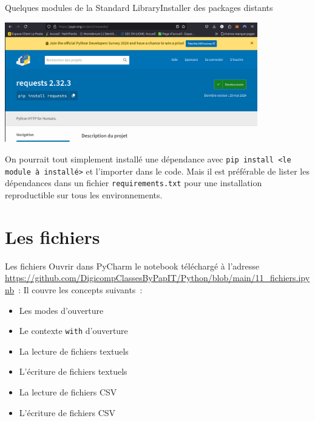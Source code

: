 \documentclass{beamer}
\begin{document}
    \begin{frame}{Quelques modules de la Standard Library}{Installer des packages distants}
        \begin{center}
            \includegraphics[width=11cm]{image/pypi-requests-page}
        \end{center}
        \begin{dangercolorbox}
            On pourrait tout simplement installé une dépendance avec \lstinline{pip install <le module à installé>} et l'importer dans le code.
            Mais il est préférable de lister les dépendances dans un fichier \lstinline{requirements.txt} pour une installation reproductible sur tous les environnements.
        \end{dangercolorbox}
    \end{frame}


    \section{Les fichiers}\label{sec:files}

    \begin{frame}{Les fichiers}
        \bigbreak
        Ouvrir dans PyCharm le notebook téléchargé à l'adresse \url{https://github.com/DigicompClassesByPapIT/Python/blob/main/11_fichiers.ipynb}~:
        Il couvre les concepts suivants~:
        \begin{itemize}
            \item Les modes d'ouverture
            \item Le contexte \lstinline{with} d'ouverture
            \item La lecture de fichiers textuels
            \item L'écriture de fichiers textuels
            \item La lecture de fichiers CSV
            \item L'écriture de fichiers CSV
        \end{itemize}
    \end{frame}
\end{document}

